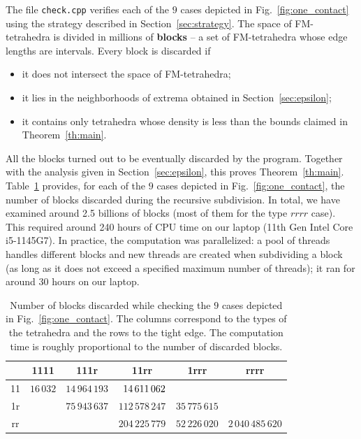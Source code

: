\documentclass[11pt]{article}
\begin{document}
The file \verb+check.cpp+ verifies each of the $9$ cases depicted in Fig.~\ref{fig:one_contact} using the strategy described in Section~\ref{sec:strategy}.
The space of FM-tetrahedra is divided in millions of {\bf blocks} -- a set of FM-tetrahedra whose edge lengths are intervals.
Every block is discarded if
\begin{itemize}
\item it does not intersect the space of FM-tetrahedra;
\item it lies in the neighborhoods of extrema obtained in Section~\ref{sec:epsilon};
\item it contains only tetrahedra whose density is less than the bounds claimed in Theorem~\ref{th:main}.
\end{itemize}
All the blocks turned out to be eventually discarded by the program.
Together with the analysis given in Section~\ref{sec:epsilon}, this proves Theorem~\ref{th:main}.
Table~\ref{tab:stats} provides, for each of the $9$ cases depicted in Fig.~\ref{fig:one_contact}, the number of blocks discarded during the recursive subdivision.
In total, we have examined around 2.5 billions of blocks (most of them for the type $rrrr$ case).
This required around 240 hours of CPU time on our laptop (11th Gen Intel Core i5-1145G7).
In practice, the computation was parallelized: a pool of threads handles different blocks and new threads are created when subdividing a block (as long as it does not exceed a specified maximum number of threads); it ran for around $30$ hours on our laptop.


\begin{table}
\centering
\begin{tabular}{|c|ccccc|}
\hline
&1111 & 111r & 11rr & 1rrr & rrrr\\
\hline
11 & $16\,032$ & $14\,964\,193$ & $\hphantom{0}14\,611\,062$ & &\\
1r & & $75\,943\,637$ & $112\,578\,247$ & $35\,775\,615$ &\\
rr & & & $204\,225\,779$ & $52\,226\,020$ & $2\,040\,485\,620$\\
\hline
\end{tabular}
\caption{
Number of blocks discarded while checking the $9$ cases depicted in Fig.~\ref{fig:one_contact}.
The columns correspond to the types of the tetrahedra and the rows to the tight edge.
The computation time is roughly proportional to the number of discarded blocks.
}
\label{tab:stats}
\end{table}


\end{document}

